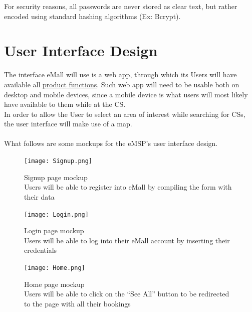 \documentclass[11pt]{article}
\begin{document}
For security reasons, all passwords are never stored as clear text, but rather encoded using standard hashing algorithms (Ex: Bcrypt). \\

\newpage

\section{User Interface Design}

The interface eMall will use is a web app, through which its Users will have available all \hyperref[subsec:prodfunctions]{product functions}. Such web app will need to be usable both on desktop and mobile devices, since a mobile device is what users will most likely have available to them while at the CS. \\
In order to allow the User to select an area of interest while searching for CSs, the user interface will make use of a map. \\
\\
What follows are some mockups for the eMSP's user interface design.

\begin{figure}[!ht]
    \centering
    \texttt{[image: Signup.png]}
    \captionsetup{justification=centering,margin=2cm}
    \caption{Signup page mockup \\
    Users will be able to register into eMall by compiling the form with their data}
    \label{fig:my_label}
\end{figure}

\newpage

\begin{figure}[!ht]
    \centering
    \texttt{[image: Login.png]}
    \captionsetup{justification=centering,margin=2cm}
    \caption{Login page mockup \\
    Users will be able to log into their eMall account by inserting their credentials}
    \label{fig:my_label}
\end{figure}

\begin{figure}[!ht]
    \centering
    \texttt{[image: Home.png]}
    \captionsetup{justification=centering,margin=2cm}
    \caption{Home page mockup \\
    Users will be able to click on the “See All” button to be redirected to the page with all their bookings}
    \label{fig:my_label}
\end{figure}
\end{document}

